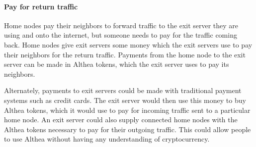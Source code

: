 \documentclass[11pt]{article}
\begin{document}
\paragraph{Pay for return traffic}
Home nodes pay their neighbors to forward traffic to the exit server they are using and onto the internet, but someone needs to pay for the traffic coming back. Home nodes give exit servers some money which the exit servers use to pay their neighbors for the return traffic. Payments from the home node to the exit server can be made in Althea tokens, which the exit server uses to pay its neighbors.

Alternately, payments to exit servers could be made with traditional payment systems such as credit cards. The exit server would then use this money to buy Althea tokens, which it would use to pay for incoming traffic sent to a particular home node. An exit server could also supply connected home nodes with the Althea tokens necessary to pay for their outgoing traffic. This could allow people to use Althea without having any understanding of cryptocurrency.
\end{document}

